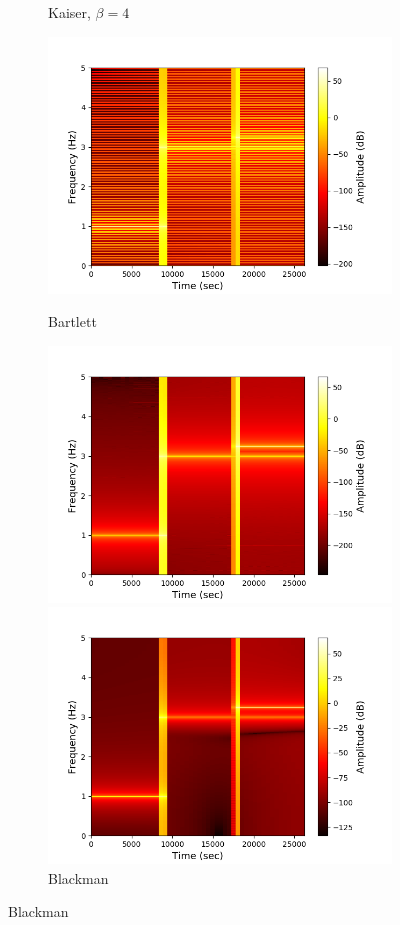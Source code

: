 \begin{figure}[H]
\begin{subfigure}{0.49\textwidth}
\caption{Kaiser, $\beta=4$}
\label{fig:stft_kaiser_10000_4}
\end{subfigure}
\begin{subfigure}{0.49\textwidth}
\centering
\includegraphics[width=\textwidth]{figures/stft_windows/bartlett_10000.png}
\caption{Bartlett}
\label{fig:stft_bartlett}
\includegraphics[width=\textwidth]{figures/stft_windows/blackman_10000.png}
\caption{Blackman}
\label{fig:stft_blackman}
\includegraphics[width=\textwidth]{figures/stft_windows/kaiser/10000/10.png}

\end{subfigure}
\end{figure}

